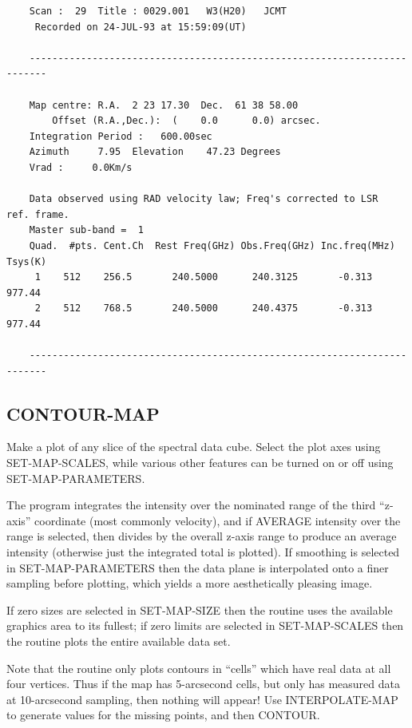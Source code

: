 \documentclass[11pt,twoside]{report}
\begin{document}
\begin{verbatim}
    Scan :  29  Title : 0029.001   W3(H20)   JCMT
     Recorded on 24-JUL-93 at 15:59:09(UT)

    -------------------------------------------------------------------------

    Map centre: R.A.  2 23 17.30  Dec.  61 38 58.00
        Offset (R.A.,Dec.):  (    0.0      0.0) arcsec.
    Integration Period :   600.00sec
    Azimuth     7.95  Elevation    47.23 Degrees
    Vrad :     0.0Km/s

    Data observed using RAD velocity law; Freq's corrected to LSR  ref. frame.
    Master sub-band =  1
    Quad.  #pts. Cent.Ch  Rest Freq(GHz) Obs.Freq(GHz) Inc.freq(MHz) Tsys(K)
     1    512    256.5       240.5000      240.3125       -0.313    977.44
     2    512    768.5       240.5000      240.4375       -0.313    977.44

    -------------------------------------------------------------------------
\end{verbatim}

\subsection{CONTOUR-MAP} 

Make a plot of any slice  of the spectral data cube.
Select the plot axes using SET-MAP-SCALES, while various other features can be
turned on or off using SET-MAP-PARAMETERS.

The program integrates the intensity over the nominated range of the third
``z-axis'' coordinate (most commonly velocity), and if AVERAGE intensity
over the range is selected, then divides by the overall z-axis range to
produce an average intensity (otherwise just the integrated total is plotted).
If smoothing is selected in SET-MAP-PARAMETERS then the data plane is
interpolated  onto a finer sampling before plotting,
which yields a more aesthetically pleasing image.

If zero sizes are selected in SET-MAP-SIZE then the routine uses the
available graphics area to its fullest; if zero limits are selected in
SET-MAP-SCALES then the routine plots the entire available data set.

Note that the routine only plots contours in ``cells'' which have real
data at all four vertices. Thus if the map has 5-arcsecond cells, but only
has measured data at 10-arcsecond sampling, then nothing will appear! Use
INTERPOLATE-MAP to generate values for the missing points, and then CONTOUR.
\end{document}
